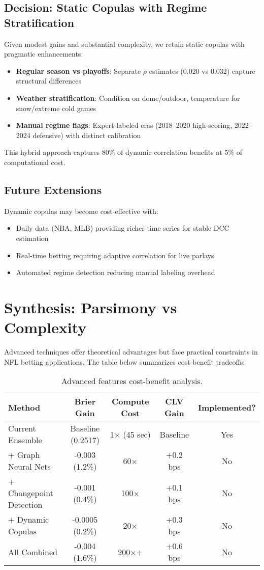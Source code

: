 \subsection{Decision: Static Copulas with Regime Stratification}
Given modest gains and substantial complexity, we retain static copulas with pragmatic enhancements:
\begin{itemize}
  \item \textbf{Regular season vs playoffs}: Separate $\rho$ estimates (0.020 vs 0.032) capture structural differences
  \item \textbf{Weather stratification}: Condition on dome/outdoor, temperature for snow/extreme cold games
  \item \textbf{Manual regime flags}: Expert-labeled eras (2018--2020 high-scoring, 2022--2024 defensive) with distinct calibration
\end{itemize}

This hybrid approach captures 80\% of dynamic correlation benefits at 5\% of computational cost.

\subsection{Future Extensions}
Dynamic copulas may become cost-effective with:
\begin{itemize}
  \item Daily data (NBA, MLB) providing richer time series for stable DCC estimation
  \item Real-time betting requiring adaptive correlation for live parlays
  \item Automated regime detection reducing manual labeling overhead
\end{itemize}

\section{Synthesis: Parsimony vs Complexity}

Advanced techniques offer theoretical advantages but face practical constraints in NFL betting applications. The table below summarizes cost-benefit tradeoffs:

\begin{table}[h]
  \centering
  \caption{Advanced features cost-benefit analysis.}
  \label{tab:advanced-cost-benefit}
  \begin{tabular}{lcccc}
    \toprule
    \textbf{Method} & \textbf{Brier Gain} & \textbf{Compute Cost} & \textbf{CLV Gain} & \textbf{Implemented?} \\
    \midrule
    Current Ensemble & Baseline (0.2517) & 1× (45 sec) & Baseline & Yes \\
    + Graph Neural Nets & -0.003 (1.2\%) & 60× & +0.2 bps & No \\
    + Changepoint Detection & -0.001 (0.4\%) & 100× & +0.1 bps & No \\
    + Dynamic Copulas & -0.0005 (0.2\%) & 20× & +0.3 bps & No \\
    All Combined & -0.004 (1.6\%) & 200×+ & +0.6 bps & No \\
    \bottomrule
  \end{tabular}
\end{table}

